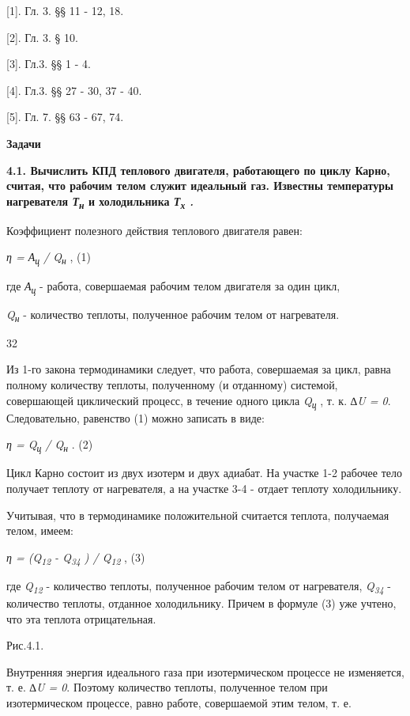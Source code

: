 {[}1{]}. Гл. 3. §§ 11 - 12, 18.

{[}2{]}. Гл. 3. § 10.

{[}3{]}. Гл.3. §§ 1 - 4.

{[}4{]}. Гл.3. §§ 27 - 30, 37 - 40.

{[}5{]}. Гл. 7. §§ 63 - 67, 74.

\textbf{Задачи}

\textbf{4.1. Вычислить КПД теплового двигателя, работающего по циклу
Карно, считая, что рабочим телом служит идеальный газ. Известны
температуры нагревателя \emph{Т\textsubscript{н}} и холодильника
\emph{Т\textsubscript{х} .}}

\solving{}

Коэффициент полезного действия теплового двигателя равен:

\emph{η = А\textsubscript{ц} / Q\textsubscript{н}} , (1)

где \emph{А\textsubscript{ц}} - работа, совершаемая рабочим телом
двигателя за один цикл,

\emph{Q\textsubscript{н}} - количество теплоты, полученное рабочим телом
от нагревателя.

32

Из 1-го закона термодинамики следует, что работа, совершаемая за цикл,
равна полному количеству теплоты, полученному (и отданному) системой,
совершающей циклический процесс, в течение одного цикла
\emph{Q\textsubscript{ц}} , т. к. \emph{∆U = 0}. Следовательно,
равенство (1) можно записать в виде:

\emph{η = Q\textsubscript{ц} / Q\textsubscript{н}} . (2)

Цикл Карно состоит из двух изотерм и двух адиабат. На участке 1-2
рабочее тело получает теплоту от нагревателя, а на участке 3-4 - отдает
теплоту холодильнику.

Учитывая, что в термодинамике положительной считается теплота,
получаемая телом, имеем:

\emph{η = (Q\textsubscript{12} - Q\textsubscript{34} ) /
Q\textsubscript{12}} , (3)

где \emph{Q\textsubscript{12}} - количество теплоты, полученное рабочим
телом от нагревателя, \emph{Q\textsubscript{34}} - количество теплоты,
отданное холодильнику. Причем в формуле (3) уже учтено, что эта теплота
отрицательная.


Рис.4.1.

Внутренняя энергия идеального газа при изотермическом процессе не
изменяется, т. е. \emph{∆U = 0}. Поэтому количество теплоты, полученное
телом при изотермическом процессе, равно работе, совершаемой этим телом,
т. е.

